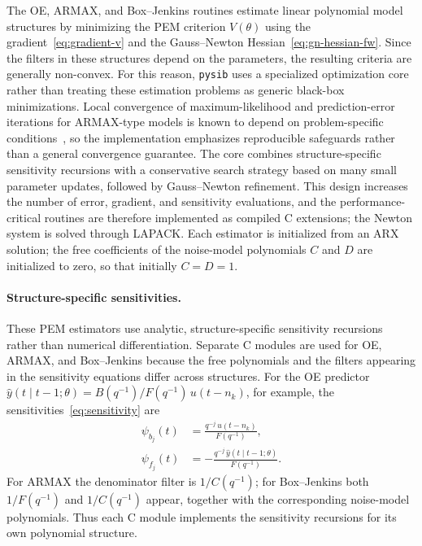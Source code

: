 \documentclass[acmsmall,screen,review]{acmart}
\begin{document}
The OE, ARMAX, and Box--Jenkins routines estimate linear polynomial model
structures by minimizing the PEM criterion $V(\theta)$ using the
gradient~\eqref{eq:gradient-v} and the Gauss--Newton
Hessian~\eqref{eq:gn-hessian-fw}.  Since the filters in these structures
depend on the parameters, the resulting criteria are generally non-convex.
For this reason, \texttt{pysib} uses a specialized optimization core rather
than treating these estimation problems as generic black-box minimizations.
Local convergence of maximum-likelihood and prediction-error iterations for
ARMAX-type models is known to depend on problem-specific
conditions~\cite{goodwin2003}, so the implementation emphasizes reproducible
safeguards rather than a general convergence guarantee.
The core combines structure-specific sensitivity recursions with a
conservative search strategy based on many small parameter updates, followed
by Gauss--Newton refinement.  This design increases the number of error,
gradient, and sensitivity evaluations, and the performance-critical routines
are therefore implemented as compiled C extensions; the Newton system is
solved through LAPACK.  Each estimator is initialized from an ARX solution;
the free coefficients of the noise-model polynomials $C$ and $D$ are
initialized to zero, so that initially $C = D = 1$.

\paragraph{Structure-specific sensitivities.}
These PEM estimators use analytic, structure-specific sensitivity
recursions rather than numerical differentiation.  Separate C modules are
used for OE, ARMAX, and Box--Jenkins because the free polynomials and the
filters appearing in the sensitivity equations differ across structures.
For the OE predictor
$\hat{y}(t \mid t-1;\theta) = B(q^{-1})/F(q^{-1})\,u(t-n_k)$, for example,
the sensitivities~\eqref{eq:sensitivity} are
\begin{align}
  \psi_{b_j}(t) &= \frac{q^{-j}\,u(t-n_k)}{F(q^{-1})},
                 \label{eq:sens-b} \\
  \psi_{f_j}(t) &= -\frac{q^{-j}\,\hat{y}(t \mid t-1;\theta)}{F(q^{-1})}.
                 \label{eq:sens-f}
\end{align}
For ARMAX the denominator filter is $1/C(q^{-1})$; for Box--Jenkins both
$1/F(q^{-1})$ and $1/C(q^{-1})$ appear, together with the corresponding
noise-model polynomials.  Thus each C module implements the sensitivity
recursions for its own polynomial structure.
\end{document}
